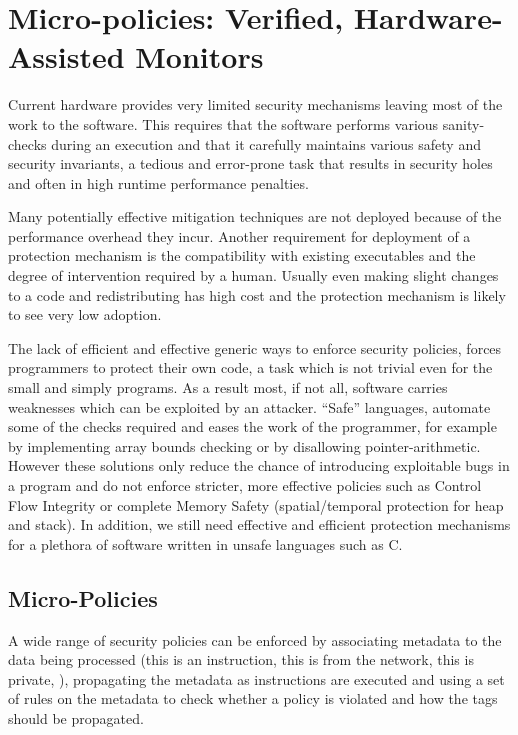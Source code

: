 \chapter{Micro-policies: Verified, Hardware-Assisted Monitors}\label{ch:policies}
Current hardware provides very limited
security mechanisms leaving most of the work to the software. This requires that the software
performs various sanity-checks during an execution and that it carefully
maintains various safety and security invariants, a tedious and error-prone task
that results in security holes and often in high runtime performance penalties.

Many potentially effective mitigation techniques are not deployed because of the
performance overhead they incur. Another requirement for deployment of a
protection mechanism is the compatibility with existing executables and
the degree of intervention required by a human.
Usually even making slight changes to a code and redistributing has high cost
and the protection mechanism is likely to see very low adoption.

The lack of efficient and effective generic ways to enforce security policies,
forces programmers to protect their own code, a task which is not trivial even
for the small and simply programs. As a result most, if not all, software
carries weaknesses which can be exploited by an attacker. ``Safe'' languages,
automate some of the checks required and eases the work of the programmer,
for example by implementing array bounds checking or by disallowing
pointer-arithmetic. However these solutions only reduce the chance of
introducing exploitable bugs in a program and do not enforce stricter,
more effective policies such as Control Flow Integrity
or complete Memory Safety (spatial/temporal protection for heap and stack).
In addition, we still need effective and efficient protection mechanisms for a
plethora of software written in unsafe languages such as C.

\section{Micro-Policies}\label{sec:micropolicies}

A wide range of security policies can be enforced by associating metadata
to the data being processed (\EG this is an instruction, this is from the
network, this is private, \ETC), propagating the metadata as
instructions are executed and using a set of rules on the metadata to check
whether a policy is violated and how the tags should be propagated.

